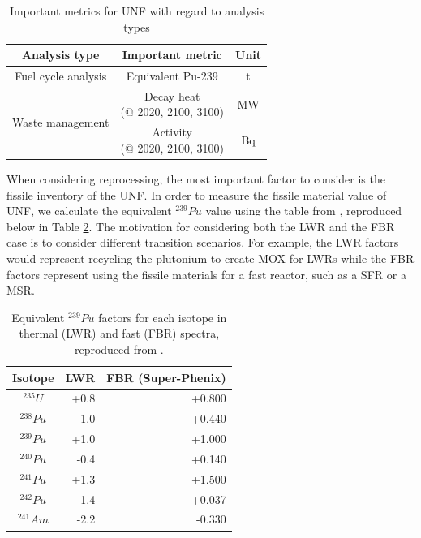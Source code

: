 \documentclass{anstrans}
\begin{document}
\begin{table}[h]
    \centering
    \begin{tabular}{ccc}
        \hline
        Analysis type & Important metric & Unit\\
        \hline
        Fuel cycle analysis & Equivalent Pu-239 & t \\
        \hline
        \multirow{2}{*}{Waste management} & \shortstack{Decay heat \\ (@ 2020, 2100, 3100)} & MW\\
        & \shortstack{Activity \\ (@ 2020, 2100, 3100)} & Bq \\
        \hline
    \end{tabular}
    \caption{Important metrics for \gls{UNF} with regard to analysis types }
    \label{tab:met}
\end{table}

When considering reprocessing, the most important
factor to consider is the fissile inventory of the \gls{UNF}.
In order to measure the fissile material value of \gls{UNF}, we calculate
the equivalent $^{239}Pu$ value using the table from \cite{anon_plutonium_1989}, reproduced below in Table \ref{tab:pu_equiv}.
The motivation for considering both the \gls{LWR} and the \gls{FBR} case is to
consider different transition scenarios. For example, the LWR factors
would represent recycling the plutonium to create \gls{MOX} for \glspl{LWR} while the \gls{FBR} factors represent using the fissile
materials for a fast reactor, such as a \gls{SFR} or a \gls{MSR}.

\begin{table}[h]
    \centering
    \begin{tabular}{crr}
        \hline
        Isotope & LWR & FBR (Super-Phenix) \\
        \hline
        $^{235}U$ & +0.8 & +0.800 \\
        $^{238}Pu$ & -1.0 & +0.440 \\
        $^{239}Pu$ & +1.0 & +1.000 \\
        $^{240}Pu$ & -0.4 & +0.140 \\
        $^{241}Pu$ & +1.3 & +1.500 \\
        $^{242}Pu$ & -1.4 & +0.037 \\
        $^{241}Am$ & -2.2 & -0.330 \\
        \hline
    \end{tabular}
    \caption{Equivalent $^{239}Pu$ factors for each isotope in thermal (LWR) and fast (FBR) spectra,
             reproduced from \cite{anon_plutonium_1989}.}
    \label{tab:pu_equiv}
\end{table}
\end{document}
